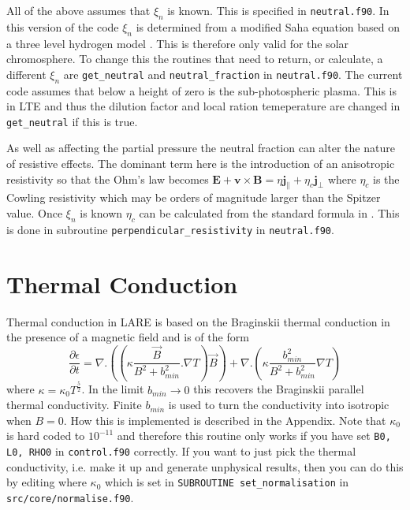 \documentclass[11pt]{article}
\begin{document}
All of the above assumes that $\xi_n$ is known. This is specified in \texttt{neutral.f90}. In this version of the code $\xi_n$ is determined from a modified Saha equation based on a three level hydrogen model \cite{brown}. This is therefore only valid for the solar chromosphere. To change this the routines that need to return, or calculate, a different $\xi_n$ are \texttt{get\_neutral} and \texttt{neutral\_fraction} in \texttt{neutral.f90}. The current code assumes that below a height of zero is the sub-photospheric plasma. This is in LTE and thus the dilution factor and local ration temeperature are changed in \texttt{get\_neutral} if this is true. 

As well as affecting the partial pressure the neutral fraction can alter the nature of resistive effects. The dominant term here is the introduction of an anisotropic resistivity so that the Ohm's law becomes 
$\mathbf{E}+\mathbf{v}\times\mathbf{B}=\eta \mathbf{j_{\parallel}} + \eta_c \mathbf{j_{\perp}}$ 
where $\eta_c$ is the Cowling resistivity which may be orders of magnitude larger than the Spitzer value. Once $\xi_n$ is known $\eta_c$ can be calculated from the standard formula in \cite{flux-emergence}. This is done in subroutine \texttt{perpendicular\_resistivity} in \texttt{neutral.f90}. 

\section{Thermal Conduction} %
\label{sec:thermal_conduction}
Thermal conduction in LARE is based on the Braginskii thermal conduction in the presence of a magnetic field and is of the form\\
\[
\frac{\partial \epsilon}{\partial t} = \nabla . \left(\left(\kappa \frac{\vec{B}}{B^2+b_{min}^2}. \nabla T\right) \vec{B} \right) +  \nabla . \left(\kappa  \frac{b_{min}^2}{B^2+b_{min}^2}  \nabla T \right)
\]
where $\kappa = \kappa_0  T^\frac{5}{2}$. In the limit $b_{min}\to 0$ this recovers the Braginskii parallel thermal conductivity. Finite $b_{min}$ is used to turn the conductivity into isotropic when $B=0$.  How this is implemented is described in the Appendix. Note that $\kappa_0$ is hard coded to $10^{-11}$ and therefore this routine only works if you have set {\tt B0, L0, RHO0} in {\tt control.f90} correctly. If you want to just pick the thermal conductivity, i.e. make it up and generate unphysical results, then you can do this by editing where $\kappa_0$ which is set in {\tt SUBROUTINE set\_normalisation} in {\tt src/core/normalise.f90}.    
\end{document}
